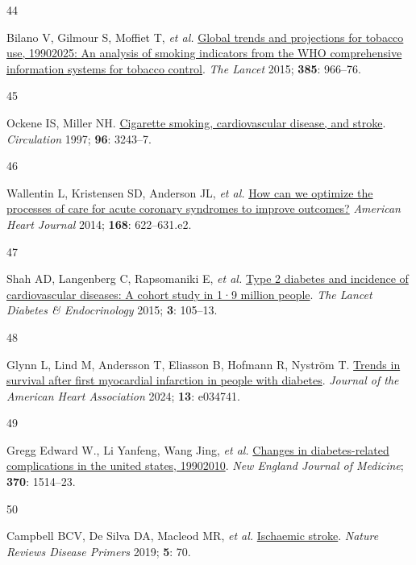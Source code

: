 \documentclass[
  a4paper,
  headsepline=true,
  open=any]{scrbook}
\newlength{\cslhangindent}
\newlength{\csllabelwidth}
\newlength{\cslentryspacingunit} %
\newenvironment{CSLReferences}[2] %
 {%
  \setlength{\parindent}{0pt}
  \ifodd #1
  \let\oldpar\par
  \def\par{\hangindent=\cslhangindent\oldpar}
  \fi
  \setlength{\parskip}{#2\cslentryspacingunit}
 }%
 {}
\newcommand{\CSLLeftMargin}[1]{\parbox[t]{\csllabelwidth}{#1}}
\newcommand{\CSLRightInline}[1]{\parbox[t]{\linewidth - \csllabelwidth}{#1}\break}
\begin{document}
\begin{CSLReferences}{0}{0}
\leavevmode{}%
\CSLLeftMargin{44 }%
\CSLRightInline{Bilano V, Gilmour S, Moffiet T, \emph{et al.}
\href{https://doi.org/10.1016/S0140-6736(15)60264-1}{Global trends and
projections for tobacco use, 1990{\textendash}2025: An analysis of
smoking indicators from the WHO comprehensive information systems for
tobacco control}. \emph{The Lancet} 2015; \textbf{385}: 966--76.}

\leavevmode{}%
\CSLLeftMargin{45 }%
\CSLRightInline{Ockene IS, Miller NH.
\href{https://doi.org/10.1161/01.CIR.96.9.3243}{Cigarette smoking,
cardiovascular disease, and stroke}. \emph{Circulation} 1997;
\textbf{96}: 3243--7.}

\leavevmode{}%
\CSLLeftMargin{46 }%
\CSLRightInline{Wallentin L, Kristensen SD, Anderson JL, \emph{et al.}
\href{https://doi.org/10.1016/j.ahj.2014.07.006}{How can we optimize the
processes of care for acute coronary syndromes to improve outcomes?}
\emph{American Heart Journal} 2014; \textbf{168}: 622--631.e2.}

\leavevmode{}%
\CSLLeftMargin{47 }%
\CSLRightInline{Shah AD, Langenberg C, Rapsomaniki E, \emph{et al.}
\href{https://doi.org/10.1016/S2213-8587(14)70219-0}{Type 2 diabetes and
incidence of cardiovascular diseases: A cohort study in 1·9 million
people}. \emph{The Lancet Diabetes \& Endocrinology} 2015; \textbf{3}:
105--13.}

\leavevmode{}%
\CSLLeftMargin{48 }%
\CSLRightInline{Glynn L, Lind M, Andersson T, Eliasson B, Hofmann R,
Nyström T. \href{https://doi.org/10.1161/JAHA.123.034741}{Trends in
survival after first myocardial infarction in people with diabetes}.
\emph{Journal of the American Heart Association} 2024; \textbf{13}:
e034741.}

\leavevmode{}%
\CSLLeftMargin{49 }%
\CSLRightInline{Gregg Edward W., Li Yanfeng, Wang Jing, \emph{et al.}
\href{https://doi.org/10.1056/NEJMoa1310799}{Changes in diabetes-related
complications in the united states, 1990{\textendash}2010}. \emph{New
England Journal of Medicine}; \textbf{370}: 1514--23.}

\leavevmode{}%
\CSLLeftMargin{50 }%
\CSLRightInline{Campbell BCV, De Silva DA, Macleod MR, \emph{et al.}
\href{https://doi.org/10.1038/s41572-019-0118-8}{Ischaemic stroke}.
\emph{Nature Reviews Disease Primers} 2019; \textbf{5}: 70.}


\end{CSLReferences}
\end{document}
